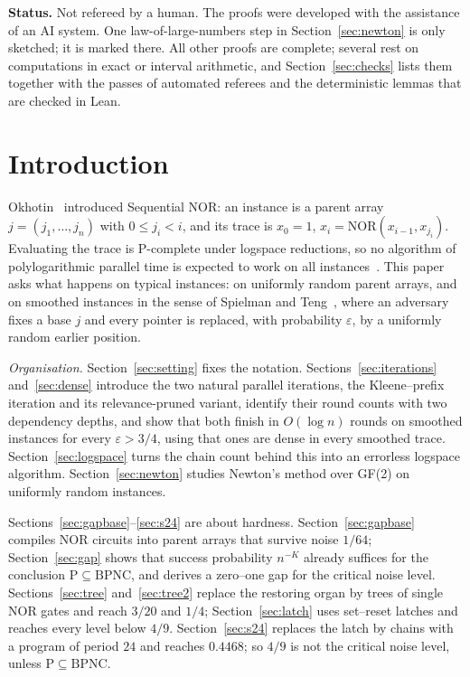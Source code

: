 \documentclass[11pt]{amsart}
\theoremstyle{definition}
\theoremstyle{remark}
\newcommand{\eps}{\varepsilon}
\newcommand{\NOR}{\mathrm{NOR}}
\begin{document}
\maketitle

\noindent\textbf{Status.} Not refereed by a human. The proofs were developed with the assistance
of an AI system. One law-of-large-numbers step in Section~\ref{sec:newton} is only sketched; it is
marked there. All other proofs are complete; several rest on computations in exact or interval
arithmetic, and Section~\ref{sec:checks} lists them together with the passes of automated
referees and the deterministic lemmas that are checked in Lean.

\section{Introduction}\label{sec:intro}

Okhotin~\cite{okhotin} introduced Sequential NOR: an instance is a parent array
$j=(j_1,\dots,j_n)$ with $0\le j_i<i$, and its trace is $x_0=1$, $x_i=\NOR(x_{i-1},x_{j_i})$.
Evaluating the trace is P-complete under logspace reductions, so no algorithm of polylogarithmic
parallel time is expected to work on all instances~\cite{ghr}. This paper asks what happens on
typical instances: on uniformly random parent arrays, and on smoothed instances in the sense of
Spielman and Teng~\cite{gb-spielmanteng}, where an adversary fixes a base $j$ and every pointer is
replaced, with probability $\eps$, by a uniformly random earlier position.

\emph{Organisation.} Section~\ref{sec:setting} fixes the notation. Sections~\ref{sec:iterations}
and~\ref{sec:dense} introduce the two natural parallel iterations, the Kleene--prefix iteration
and its relevance-pruned variant, identify their round counts with two dependency depths, and
show that both finish in $O(\log n)$ rounds on smoothed instances for every $\eps>3/4$, using
that ones are dense in every smoothed trace. Section~\ref{sec:logspace} turns the chain count
behind this into an errorless logspace algorithm. Section~\ref{sec:newton} studies Newton's
method over GF(2) on uniformly random instances.

Sections~\ref{sec:gapbase}--\ref{sec:s24} are about hardness. Section~\ref{sec:gapbase}
compiles NOR circuits into parent arrays that survive noise $1/64$; Section~\ref{sec:gap} shows
that success probability $n^{-K}$ already suffices for the conclusion
$\mathrm P\subseteq\mathrm{BPNC}$, and derives a zero--one gap for the critical noise level.
Sections~\ref{sec:tree} and~\ref{sec:tree2} replace the restoring organ by trees of single NOR
gates and reach $3/20$ and $1/4$; Section~\ref{sec:latch} uses set--reset latches and reaches every
level below $4/9$. Section~\ref{sec:s24} replaces the latch by chains with a program of period
$24$ and reaches $0.4468$; so $4/9$ is not the critical noise level, unless
$\mathrm P\subseteq\mathrm{BPNC}$.
\end{document}
